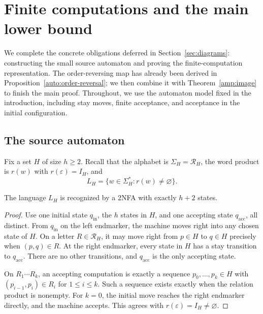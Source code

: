 \section{Finite computations and the main lower bound}\label{auto:section}

We complete the concrete obligations deferred in
Section~\ref{sec:diagrams}: constructing the small source automaton and
proving the finite-computation representation. The order-reversing map
has already been derived in Proposition~\ref{auto:order-reversal};
we then combine it with Theorem~\ref{amp:image} to finish the main proof.
Throughout, we use the automaton model fixed in the introduction,
including stay moves, finite acceptance, and acceptance in the initial
configuration.

\subsection{The source automaton}

Fix a set $H$ of size $h\geq2$. Recall that the alphabet is
$\Sigma_H=\mathcal R_H$, the word product is $r(w)$ with
$r(\varepsilon)=I_H$, and
\begin{equation}\label{auto:language}
 L_H=\{w\in\Sigma_H^*:r(w)\ne\varnothing\}.
\end{equation}

\begin{lemma}\label{auto:source}
The language $L_H$ is recognized by a 2NFA with exactly $h+2$ states.
\end{lemma}
\begin{proof}
Use one initial state $q_{\mathrm{in}}$, the $h$ states in $H$, and one
accepting state $q_{\mathrm{acc}}$, all distinct.  From
$q_{\mathrm{in}}$ on the left endmarker, the machine moves right into any
chosen state of $H$.  On a letter $R\in\mathcal R_H$, it may move right
from $p\in H$ to $q\in H$ precisely when $(p,q)\in R$.  At the right
endmarker, every state in $H$ has a stay transition to
$q_{\mathrm{acc}}$.  There are no other transitions, and
$q_{\mathrm{acc}}$ is the only accepting state.

On $R_1\cdots R_k$, an accepting computation is exactly a sequence
$p_0,\ldots,p_k\in H$ with $(p_{i-1},p_i)\in R_i$ for
$1\leq i\leq k$.  Such a sequence exists exactly when the relation
product is nonempty.  For $k=0$, the initial move reaches the right
endmarker directly, and the machine accepts.  This agrees with
$r(\varepsilon)=I_H\ne\varnothing$.
\end{proof}

